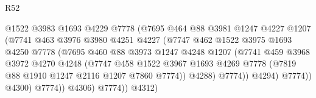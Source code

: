 \begin{lexlean}{R52}
\begin{coremodule}
                                    @1522
                                    @3983
                                    @1693
                                    @4229
                                    @7778
                                    (@7695
                                      @464
                                      @88
                                      @3981
                                      @1247
                                      @4227
                                      @1207
                                      (@7741
                                        @463
                                        @3976
                                        @3980
                                        @4251
                                        @4227
                                        (@7747
                                          @462
                                          @1522
                                          @3975
                                          @1693
                                          @4250
                                          @7778
                                          (@7695
                                            @460
                                            @88
                                            @3973
                                            @1247
                                            @4248
                                            @1207
                                            (@7741
                                              @459
                                              @3968
                                              @3972
                                              @4270
                                              @4248
                                              (@7747
                                                @458
                                                @1522
                                                @3967
                                                @1693
                                                @4269
                                                @7778
                                                (@7819 @88 @1910 @1247 @2116 @1207 @7860 @7774))
                                              @4288)
                                            @7774))
                                        @4294)
                                      @7774))
                                  @4300)
                                @7774))
                            @4306)
                          @7774))
                      @4312)

\end{coremodule}
\end{lexlean}

